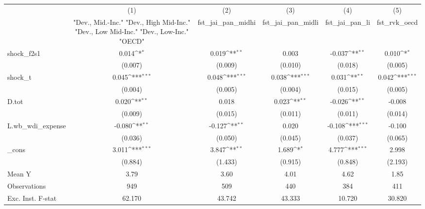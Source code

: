 {
\def\sym#1{\ifmmode^{#1}\else\(^{#1}\)\fi}
\begin{tabular}{l*{5}{c}}
\toprule
            &\multicolumn{1}{c}{(1)}&\multicolumn{1}{c}{(2)}&\multicolumn{1}{c}{(3)}&\multicolumn{1}{c}{(4)}&\multicolumn{1}{c}{(5)}\\
            &\multicolumn{1}{c}{ "Dev., Mid.-Inc." "Dev., High Mid-Inc." "Dev., Low Mid-Inc." "Dev., Low-Inc." "OECD" }&\multicolumn{1}{c}{fst\_jai\_pan\_midhi}&\multicolumn{1}{c}{fst\_jai\_pan\_midli}&\multicolumn{1}{c}{fst\_jai\_pan\_li}&\multicolumn{1}{c}{fst\_rvk\_oecd}\\
\midrule
shock\_f2s1  &       0.014\sym{*}  &       0.019\sym{**} &       0.003         &      -0.037\sym{**} &       0.010\sym{*}  \\
            &     (0.007)         &     (0.009)         &     (0.010)         &     (0.018)         &     (0.005)         \\
\addlinespace
shock\_t     &       0.045\sym{***}&       0.048\sym{***}&       0.038\sym{***}&       0.031\sym{**} &       0.042\sym{***}\\
            &     (0.004)         &     (0.005)         &     (0.004)         &     (0.015)         &     (0.005)         \\
\addlinespace
D.tot       &       0.020\sym{**} &       0.018         &       0.023\sym{**} &      -0.026\sym{**} &      -0.008         \\
            &     (0.009)         &     (0.015)         &     (0.011)         &     (0.011)         &     (0.014)         \\
\addlinespace
L.wb\_wdi\_expense&      -0.080\sym{**} &      -0.127\sym{**} &       0.020         &      -0.108\sym{***}&      -0.100         \\
            &     (0.036)         &     (0.050)         &     (0.045)         &     (0.037)         &     (0.065)         \\
\addlinespace
\_cons      &       3.011\sym{***}&       3.847\sym{**} &       1.689\sym{*}  &       4.777\sym{***}&       2.998         \\
            &     (0.884)         &     (1.433)         &     (0.915)         &     (0.848)         &     (2.193)         \\
\midrule
Mean Y      &        3.79         &        3.60         &        4.01         &        4.62         &        1.85         \\
Observations&         949         &         509         &         440         &         384         &         411         \\
Exc. Inst. F-stat&      62.170         &      43.742         &      43.333         &      10.720         &      30.820         \\
\bottomrule
\end{tabular}
}
